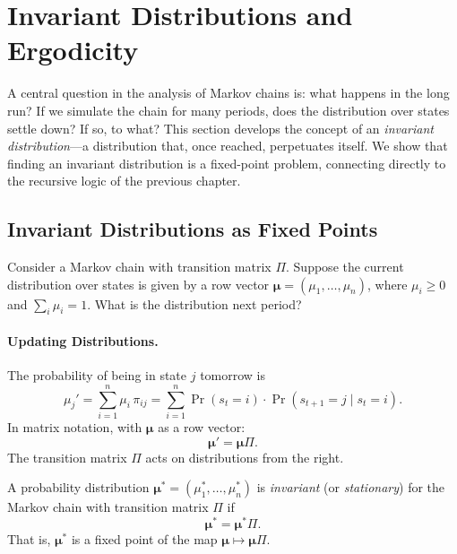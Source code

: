 
\section{Invariant Distributions and Ergodicity}
\label{sec:invariant-distributions}

A central question in the analysis of Markov chains is: what happens in the long run? If we simulate the chain for many periods, does the distribution over states settle down? If so, to what? This section develops the concept of an \emph{invariant distribution}---a distribution that, once reached, perpetuates itself. We show that finding an invariant distribution is a fixed-point problem, connecting directly to the recursive logic of the previous chapter.

\subsection{Invariant Distributions as Fixed Points}
\label{subsec:invariant-fixed-point}

Consider a Markov chain with transition matrix $\Pi$. Suppose the current distribution over states is given by a row vector $\boldsymbol{\mu} = (\mu_1, \ldots, \mu_n)$, where $\mu_i \geq 0$ and $\sum_i \mu_i = 1$. What is the distribution next period?

\paragraph{Updating Distributions.}
The probability of being in state $j$ tomorrow is
\begin{equation}
\mu_j' = \sum_{i=1}^{n} \mu_i \, \pi_{ij} = \sum_{i=1}^{n} \Pr(s_t = i) \cdot \Pr(s_{t+1} = j \mid s_t = i).
\label{eq:distribution-update}
\end{equation}
In matrix notation, with $\boldsymbol{\mu}$ as a row vector:
\begin{equation}
\boldsymbol{\mu}' = \boldsymbol{\mu} \Pi.
\label{eq:distribution-update-matrix}
\end{equation}
The transition matrix $\Pi$ acts on distributions from the right.

\begin{definition}
\label{def:invariant}
A probability distribution $\boldsymbol{\mu}^* = (\mu_1^*, \ldots, \mu_n^*)$ is \emph{invariant} (or \emph{stationary}) for the Markov chain with transition matrix $\Pi$ if
\begin{equation}
\boldsymbol{\mu}^* = \boldsymbol{\mu}^* \Pi.
\label{eq:invariant-definition}
\end{equation}
That is, $\boldsymbol{\mu}^*$ is a fixed point of the map $\boldsymbol{\mu} \mapsto \boldsymbol{\mu} \Pi$.
\end{definition}

